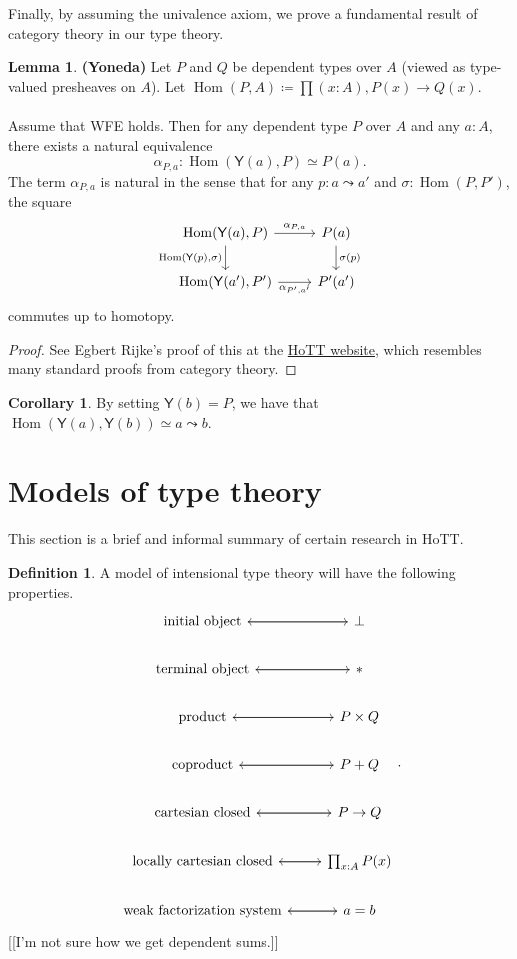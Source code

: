 \documentclass[10pt,letterpaper,cm]{nupset}
\theoremstyle{definition}
\newtheorem*{definition}{Definition}
\newtheorem{corollary}{Corollary}
\newtheorem{lemma}{Lemma}
\newcommand{\1}{\mathbf{1}}
\newcommand{\0}{\vec 0}
\DeclareMathOperator{\Hom}{Hom}
\begin{document}
Finally, by assuming the univalence axiom, we prove a fundamental result of category theory in our type theory.

\begin{lemma}{\textbf{(Yoneda)}}
Let $P$ and $Q$ be dependent types over $A$ (viewed as type-valued presheaves on $A$). Let $\Hom(P, A) \coloneqq \prod(x:A), P(x) \to Q(x)$.
\\ \\
Assume that WFE holds. Then for any dependent type $P$ over $A$ and any $a: A$, there exists a natural equivalence $$ \alpha_{P,a} :\Hom(\mathsf{Y}(a), P)\simeq P(a) . $$ The term $ \alpha_{P,a} $ is natural in the sense that for any $p: a\leadsto a'$ and $\sigma : \Hom(P, P')$, the square
\[
\begin{tikzcd}
{\Hom(\mathsf{Y}(a), P)} \arrow[r, "{\alpha_{P,a}}"] \arrow[d, "{\Hom(\mathsf{Y}(p), \sigma)}"'] & P(a) \arrow[d, "\sigma(p)"] \\
{\Hom(\mathsf{Y}(a'), P')} \arrow[r, "{\alpha_{P', a'}}"'] & P'(a')
\end{tikzcd}\] commutes up to homotopy.
\end{lemma}
\begin{proof}
See Egbert Rijke's proof of this at the \href{https://homotopytypetheory.org/2012/05/02/a-type-theoretical-yoneda-lemma/}{HoTT website}, which resembles many standard proofs from category theory.
\end{proof}

\begin{corollary}
By setting $\mathsf{Y}(b) = P$, we have that $\Hom(\mathsf{Y}(a), \mathsf{Y}(b)) \simeq a \leadsto b$.
\end{corollary}

\section{Models of type theory}

This section is a brief and informal summary of certain research in HoTT.

\begin{definition}
A model of intensional type theory will have the following properties.
\[
\begin{tikzcd}
\text{initial object} \arrow[r] & \bot \arrow[l] \\
\text{terminal object} \arrow[r] & \ast \arrow[l] \\
\text{product} \arrow[r] & P\times Q \arrow[l] \\
\text{coproduct} \arrow[r] & P + Q \arrow[l] \\
\text{cartesian closed} \arrow[r] & P \to Q \arrow[l] \\
\text{locally cartesian closed} \arrow[r] & \prod_{x:A}P(x) \arrow[l] \\
\text{weak factorization system} \arrow[r] & a=b \arrow[l]
\end{tikzcd}
.\] {[[I'm not sure how we get dependent sums.]]}
\end{definition}
\end{document}
